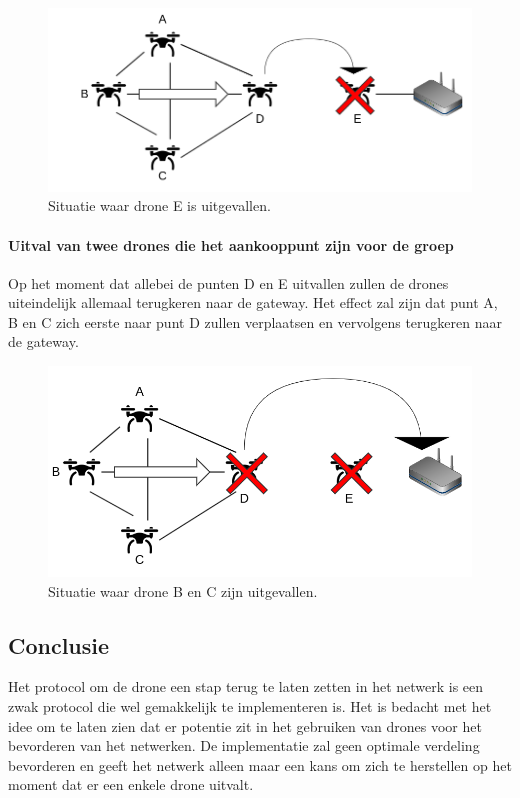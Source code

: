 \documentclass[a4paper, 11pt, oneside]{report}
\begin{document}
\begin{figure}[H]
	\begin{center}\includegraphics[width=.8\linewidth]{Afbeeldingen/droneopstelling_GroepXL_een_kapot.png}\end{center}
	\caption{Situatie waar drone E is uitgevallen.}
	\label{fig:groep_E_kapot}
\end{figure}

\paragraph{Uitval van twee drones die het aankooppunt zijn voor de groep}
Op het moment dat allebei de punten D en E uitvallen zullen de drones uiteindelijk allemaal terugkeren naar de gateway. 
Het effect zal zijn dat punt A, B en C zich eerste naar punt D zullen verplaatsen en vervolgens terugkeren naar de gateway.    
\begin{figure}[H]
	\begin{center}\includegraphics[width=.85\linewidth]{Afbeeldingen/droneopstelling_Groep_meer_kapot.png}\end{center}
	\caption{Situatie waar drone B en C zijn uitgevallen.}
	\label{fig:groep_B_C_kapot}
\end{figure}


\subsection{Conclusie}

Het protocol om de drone een stap terug te laten zetten in het netwerk is een zwak protocol die wel gemakkelijk te implementeren is.
Het is bedacht met het idee om te laten zien dat er potentie zit in het gebruiken van drones voor het bevorderen van het netwerken.
De implementatie zal geen optimale verdeling bevorderen en geeft het netwerk alleen maar een kans om zich te herstellen op het moment dat er een enkele drone uitvalt.
\end{document}
